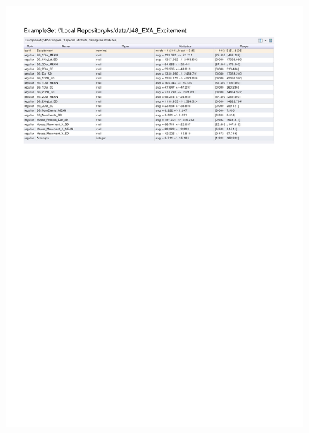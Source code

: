\begin{figure}[htp]
  \centerline{\includegraphics[trim=0 560 0 60,clip,width=16.09cm]{results/J48_EXA_Excitement.pdf}} \caption{
} \label{J48_K_Excitement}
\end{figure}

